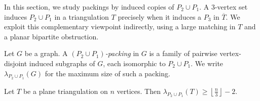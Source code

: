\documentclass{patmorin}
\newcommand{\defin}[1]{\emph{\textcolor{brightmaroon}{#1}}}
\begin{document}
In this section, we study packings by induced copies of $P_2\cup P_1$.
A $3$-vertex set induces $P_2\cup P_1$ in a triangulation $T$ precisely when it
induces a $P_3$ in $\overline T$. We exploit this complementary viewpoint
indirectly, using a large matching in $T$ and a planar bipartite obstruction.

\begin{defn}
Let $G$ be a graph. A \defin{$(P_2\cup P_1)$-packing} in $G$ is a family of pairwise vertex-disjoint induced subgraphs of $G$, each isomorphic to $P_2\cup P_1$. We write $\lambda_{P_2\cup P_1}(G)$
for the maximum size of such a packing.
\end{defn}

\begin{thm}\label{thm:p2p1-packing}
Let $T$ be a plane triangulation on $n$ vertices. Then
$\lambda_{P_2\cup P_1}(T)\ge \left\lfloor \frac n3\right\rfloor-2$.
\end{thm}
\end{document}
